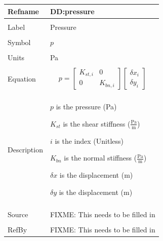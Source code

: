 \documentclass[12pt]{article}
\begin{document}
\noindent \begin{minipage}{\textwidth}
\begin{tabular}{p{} p{}}
\toprule \textbf{Refname} & \textbf{DD:pressure}
\label{DD:pressure}
\\ \midrule \\
Label & Pressure
\\ \midrule \\
Symbol & $p$
\\ \midrule \\
Units & Pa
\\ \midrule \\
Equation & \begin{dmath}
           p=\begin{bmatrix}
{K_{st,i}} & 0\\
0 & {K_{bn,i}}
\end{bmatrix} \begin{bmatrix}
{δx}_{i}\\
{δy}_{i}
\end{bmatrix}
           \end{dmath}
\\ \midrule \\
Description & \begin{symbDescription}
              \item{$p$ is the pressure (Pa)}
              \item{${K_{st}}$ is the shear stiffness ($\frac{\text{Pa}}{\text{m}}$)}
              \item{$i$ is the index (Unitless)}
              \item{${K_{bn}}$ is the normal stiffness ($\frac{\text{Pa}}{\text{m}}$)}
              \item{$δx$ is the displacement (m)}
              \item{$δy$ is the displacement (m)}
              \end{symbDescription}
\\ \midrule \\
Source & FIXME: This needs to be filled in
\\ \midrule \\
RefBy & FIXME: This needs to be filled in
\\ \bottomrule \end{tabular}
\end{minipage}\\
~\newline
\end{document}

